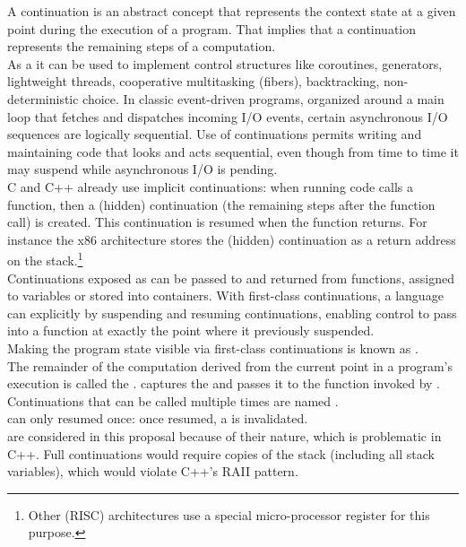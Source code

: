 \newpage
{}

A continuation is an abstract concept that represents the context state at a
given point during the execution of a program. That implies that a continuation
represents the remaining steps of a computation.\\

As a  it can be used to implement control
structures like coroutines,  generators, lightweight threads, cooperative
multitasking (fibers), backtracking, non-deterministic choice. In classic
event-driven programs, organized around a main loop that fetches and dispatches
incoming I/O events, certain asynchronous I/O sequences are logically
sequential. Use of continuations permits writing and maintaining code that
looks and acts sequential, even though from time to time it may suspend while
asynchronous I/O is pending.\\

C and C++ already use implicit continuations: when running code calls a
function, then a (hidden) continuation (the remaining steps after the function
call) is created. This continuation is resumed when the function returns. For
instance the x86 architecture stores the (hidden) continuation as a return
address on the stack.\footnote{Other (RISC) architectures use a special
micro-processor register for this purpose.}\\

Continuations exposed as  can be passed to and
returned from functions, assigned to variables or stored into containers. With
first-class continuations, a language can explicitly  by suspending and resuming continuations, enabling control to pass
into a function at exactly the point where it previously suspended.\\
Making the program state visible via first-class continuations is known as
.\\

The remainder of the computation derived from the current point in a
program's execution is called the . \cc captures the
 and passes it to the function invoked by
\cc.\\

Continuations that can be called multiple times are named
.\\
 can only resumed once: once resumed, a
 is invalidated.\\
 are  considered in this proposal because of
their nature, which is problematic in C++. Full continuations would require copies of
the stack (including all stack variables), which would violate C++'s RAII pattern.\\

